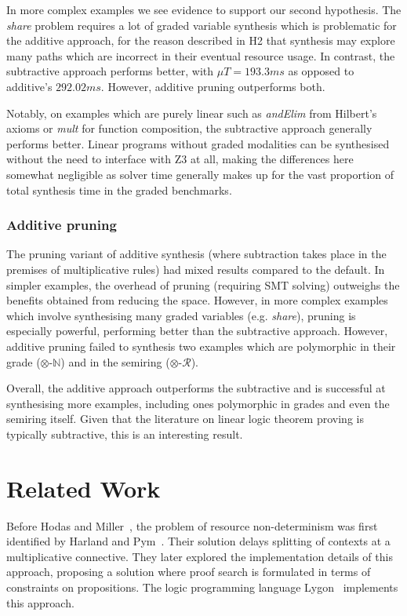 In more complex examples we see evidence to support our second hypothesis. The
\textit{share} problem requires a lot of graded variable synthesis which is
problematic for the additive approach, for the reason described in H2 that synthesis 
may explore many paths which are incorrect in their eventual resource usage. In
contrast, the subtractive approach performs better, with $\mu{T} =
193.3\textit{ms}$ as opposed to additive's $292.02\textit{ms}$. However,
additive pruning outperforms both.

Notably, on examples which are purely linear such as \textit{andElim} from
Hilbert's axioms or \textit{mult} for function composition, the subtractive
approach generally performs better. Linear programs without graded modalities
can be synthesised without the need to interface with Z3 at all, making the
differences here somewhat negligible as solver time generally makes up for the
vast proportion of total synthesis time in the graded benchmarks.

\subsubsection{Additive pruning}
The pruning variant of additive synthesis (where subtraction
takes place in the premises of multiplicative rules) had mixed results
compared to the default. In simpler examples, the overhead of pruning
(requiring SMT solving) outweighs
the benefits obtained from reducing the space. However, in more
complex examples which involve synthesising many graded variables (e.g. \textit{share}), pruning is
especially powerful, performing better than the subtractive
approach. However, additive pruning failed to synthesis two
 examples which are polymorphic in their grade
 ($\otimes$-$\mathbb{N}$) and in the semiring ($\otimes$-$\mathcal{R}$).


Overall, the additive approach outperforms the subtractive and is successful at
synthesising more examples, including ones polymorphic in grades and even the
semiring itself. Given that the literature on linear logic theorem proving is
typically subtractive, this is an interesting result. 

\section{Related Work}
\label{sec:linear-base-related}
Before Hodas and Miller~\cite{HODAS1994327}, the problem of resource
non-determinism was first identified by Harland and Pym~\cite{harlandpym}. Their
solution delays splitting of contexts at a multiplicative connective. They later
explored the implementation details of this approach, proposing a solution where
proof search is formulated in terms of constraints on propositions. The logic
programming language Lygon~\cite{lygon} implements this approach.

